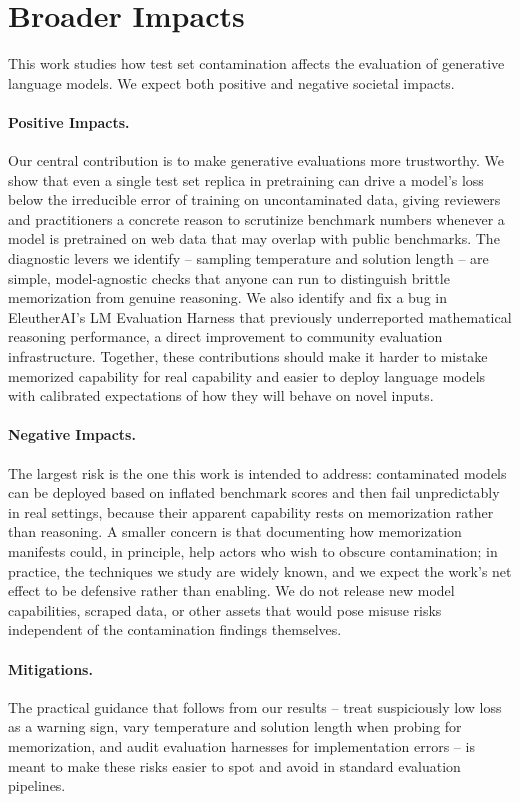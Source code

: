 \section{Broader Impacts}
\label{app:sec:broader_impacts}

This work studies how test set contamination affects the evaluation of generative language models. We expect both positive and negative societal impacts.

\paragraph{Positive Impacts.}
Our central contribution is to make generative evaluations more trustworthy. We show that even a single test set replica in pretraining can drive a model's loss below the irreducible error of training on uncontaminated data, giving reviewers and practitioners a concrete reason to scrutinize benchmark numbers whenever a model is pretrained on web data that may overlap with public benchmarks. The diagnostic levers we identify -- sampling temperature and solution length -- are simple, model-agnostic checks that anyone can run to distinguish brittle memorization from genuine reasoning. We also identify and fix a bug in EleutherAI's LM Evaluation Harness that previously underreported mathematical reasoning performance, a direct improvement to community evaluation infrastructure. Together, these contributions should make it harder to mistake memorized capability for real capability and easier to deploy language models with calibrated expectations of how they will behave on novel inputs.

\paragraph{Negative Impacts.}
The largest risk is the one this work is intended to address: contaminated models can be deployed based on inflated benchmark scores and then fail unpredictably in real settings, because their apparent capability rests on memorization rather than reasoning. A smaller concern is that documenting how memorization manifests could, in principle, help actors who wish to obscure contamination; in practice, the techniques we study are widely known, and we expect the work's net effect to be defensive rather than enabling. We do not release new model capabilities, scraped data, or other assets that would pose misuse risks independent of the contamination findings themselves.

\paragraph{Mitigations.}
The practical guidance that follows from our results -- treat suspiciously low loss as a warning sign, vary temperature and solution length when probing for memorization, and audit evaluation harnesses for implementation errors -- is meant to make these risks easier to spot and avoid in standard evaluation pipelines.
